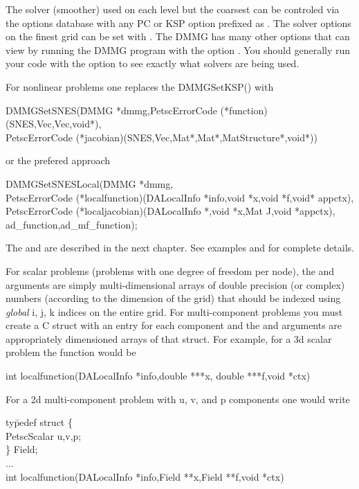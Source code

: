 The solver (smoother) used on each level but the coarsest can be controled via the options
database with any PC or KSP option prefixed as . The 
solver options on the finest grid can be set with  . The 
DMMG has many other options that can view by running the DMMG program with the option .
You should generally run your code with the option  to see exactly what 
solvers are being used.

For nonlinear problems one replaces the DMMGSetKSP() with 
\begin{tabbing}
  DMMGSetSNES(\=DMMG *dmmg,PetscErrorCode (*function)(SNES,Vec,Vec,void*),\\
             \>PetscErrorCode (*jacobian)(SNES,Vec,Mat*,Mat*,MatStructure*,void*))
\end{tabbing}
or the prefered approach
\begin{tabbing}
  DMMGSetSNESLocal(\=DMMG *dmmg,\\
  \>PetscErrorCode (*localfunction)(DALocalInfo *info,void *x,void *f,void* appctx),\\
  \>PetscErrorCode (*localjacobian)(DALocalInfo *,void *x,Mat J,void *appctx),\\
  \>ad\_function,ad\_mf\_function);
\end{tabbing}
The  and  are described in the next chapter.  
See examples  and  for complete details.

For scalar problems (problems with one degree of freedom per node),
the   and  arguments are simply
multi-dimensional arrays of double precision (or complex) numbers
(according to the dimension of the grid) that should be indexed using
{\em global} i, j, k indices on the entire grid. For multi-component
problems you must create a C struct with an entry for each component
and the  and  arguments are appropriately dimensioned
arrays of that struct. For example, for a 3d scalar problem the function
would be 
\begin{tabbing}
int localfunction(DALocalInfo *info,double ***x, double ***f,void *ctx)
\end{tabbing}
For a 2d multi-component problem with u, v, and p components one would write
\begin{tabbing}
ty\=pedef struct \{\\
  \> PetscScalar u,v,p;\\
 \} Field;\\
...\\
int localfunction(DALocalInfo *info,Field **x,Field **f,void *ctx)
\end{tabbing}

